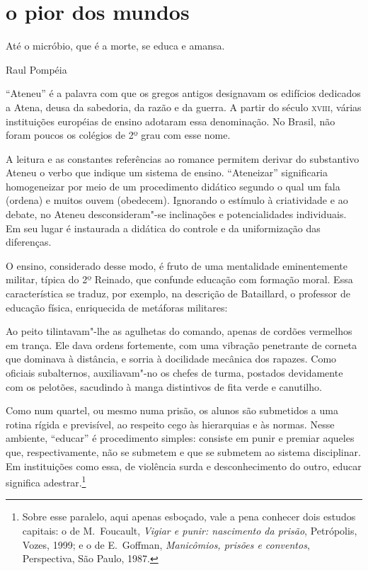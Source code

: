 \section*{o pior dos mundos}

\epigraph{Até o micróbio, que é a morte, se educa e amansa.}{Raul Pompéia}

``Ateneu'' é a palavra com que os gregos antigos
designavam os edifícios dedicados a Atena, deusa da sabedoria, da razão
e da guerra. A partir do século \textsc{xviii}, várias instituições européias de
ensino adotaram essa denominação. No Brasil, não foram poucos os
colégios de 2º grau com esse nome.


A leitura e as constantes referências ao romance permitem derivar do
substantivo Ateneu o verbo que indique um sistema de ensino.
``Ateneizar'' significaria homogeneizar por meio de um
procedimento didático segundo o qual um fala (ordena) e muitos ouvem
(obedecem). Ignorando o estímulo à criatividade e ao debate, no Ateneu
desconsideram"-se inclinações e potencialidades individuais. Em seu
lugar é instaurada a didática do controle e da uniformização das
diferenças.


O ensino, considerado desse modo, é fruto de uma
mentalidade eminentemente militar, típica do
2º Reinado, que confunde educação com formação moral. Essa característica se traduz,
por exemplo, na descrição de Bataillard, o professor de educação
física, enriquecida de metáforas militares: 

\begin{hedraquote}
Ao peito tilintavam"-lhe as agulhetas do comando, apenas de cordões
vermelhos em trança. Ele dava ordens fortemente, com uma vibração
penetrante de corneta que dominava à distância, e sorria à docilidade
mecânica dos rapazes. Como oficiais subalternos, auxiliavam"-no os
chefes de turma, postados devidamente com os pelotões, sacudindo à
manga distintivos de fita verde e canutilho.
\end{hedraquote}

Como num quartel, ou mesmo numa prisão, os alunos são
submetidos a uma rotina rígida e previsível, ao respeito cego às
hierarquias e às normas. Nesse ambiente, ``educar'' é procedimento
simples: consiste em punir e premiar aqueles que, respectivamente, não
se submetem e que se submetem ao sistema disciplinar. Em instituições
como essa, de violência surda e desconhecimento do outro, educar
significa adestrar.\footnote{ Sobre esse paralelo, aqui apenas
esboçado, vale a pena conhecer dois estudos capitais: o de M.~Foucault,
\textit{Vigiar e punir: nascimento da prisão}, Petrópolis, Vozes, 1999; 
e o de E.~Goffman, \textit{Manicômios, prisões e
conventos}, Perspectiva, São Paulo, 1987.}


